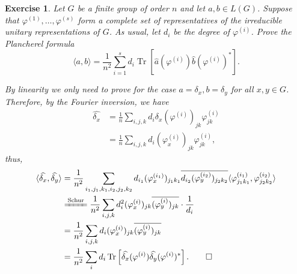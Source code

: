 \documentclass[11pt]{report}
\theoremstyle{mythm}
\let\oldendproof\endproof
\renewenvironment{proof}[1][\proofname]{%
  \oldproof[\normalfont \bfseries #1]%
}{\oldendproof}
\newtheorem{exercise}{Exercise}[chapter]
\renewcommand*{\proofname}{Proof}
\theoremstyle{myans}
\DeclareMathOperator{\Tr}{Tr}
\newcommand{\ang}[1]{\langle #1 \rangle}
\begin{document}
\begin{exercise}
  Let $G$ be a finite group of order $n$ and let $a, b \in L(G)$. Suppose
  that $\varphi^{(1)},\dots ,\varphi^{(s)}$ form a complete set of representatives
  of the irreducible unitary representations of $G$. As usual, let $d_i$ be the
  degree of $\varphi^{(i)}$. Prove the Plancherel formula
  \[ \ang{a, b} = \frac 1 {n^2} \sum_{i=1}^s d_i \Tr \left[ \hat{a}(\varphi^{(i)})
  \hat b(\varphi^{(i)})^* \right]. \]
  \begin{proof}
    By linearity we only need to prove for the case $a = \delta_x, b = \delta_y$
    for all $x, y\in G$. Therefore, by the Fourier inversion, we have
    \begin{align*}
      \widehat{\delta_x} &= \frac 1 n \sum_{i,j,k} d_i \delta_x(\varphi^{(i)})_{jk} \varphi^{(i)}_{jk}\\
      &= \frac 1n \sum_{i,j,k} d_i (\varphi^{(i)}_x)_{jk} \varphi^{(i)}_{jk},
    \end{align*}
    thus,
    \begin{align*}
      \ang{\widehat{\delta_x}, \widehat{\delta_y}}
      &= \frac 1{n^2} \sum_{i_1,j_1,k_1, i_2, j_2, k_2}
      d_{i_1} (\varphi^{(i_1)}_x)_{j_1k_1}
      \overline{d_{i_2} (\varphi^{(i_2)}_y)_{j_2k_2}}
      \ang{\varphi_{j_1k_1}^{(i_1)}, \varphi_{j_2k_2}^{(i_2)}}\\
      &\xlongequal{\text{Schur}}
      \frac 1{n^2} \sum_{i,j,k} d_i^2 (\varphi^{(i)}_x)_{jk}
      \overline{(\varphi^{(i)}_y)_{jk}} \cdot \frac 1{d_i}\\
      &= \frac 1{n^2} \sum_{i,j,k} d_i (\varphi^{(i)}_x)_{jk}
      \overline{(\varphi^{(i)}_y)_{jk}}\\
      &= \frac 1{n^2} \sum_{i} d_i \Tr \left[ \widehat{\delta_x}(\varphi^{(i)})
      \widehat{\delta_y} (\varphi^{(i)})^* \right]. \qedhere
    \end{align*}
  \end{proof}
\end{exercise}
\end{document}
